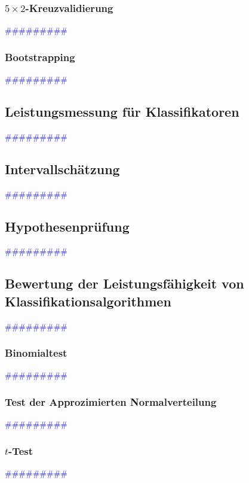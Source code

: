 \documentclass{article}
\begin{document}
    \subsubsection{$5 \times 2$-Kreuzvalidierung} %
       \textcolor{blue}{\#\#\#\#\#\#\#\#\#}
    \subsubsection{Bootstrapping} %
       \textcolor{blue}{\#\#\#\#\#\#\#\#\#}
  \subsection{Leistungsmessung für Klassifikatoren} %
       \textcolor{blue}{\#\#\#\#\#\#\#\#\#}
  \subsection{Intervallschätzung} %
       \textcolor{blue}{\#\#\#\#\#\#\#\#\#}
  \subsection{Hypothesenprüfung} %
       \textcolor{blue}{\#\#\#\#\#\#\#\#\#}
  \subsection{Bewertung der Leistungsfähigkeit von Klassifikationsalgorithmen} %
       \textcolor{blue}{\#\#\#\#\#\#\#\#\#}
    \subsubsection{Binomialtest} %
       \textcolor{blue}{\#\#\#\#\#\#\#\#\#}
    \subsubsection{Test der Approzimierten Normalverteilung} %
       \textcolor{blue}{\#\#\#\#\#\#\#\#\#}
    \subsubsection{$t$-Test} %
       \textcolor{blue}{\#\#\#\#\#\#\#\#\#}
\end{document}

